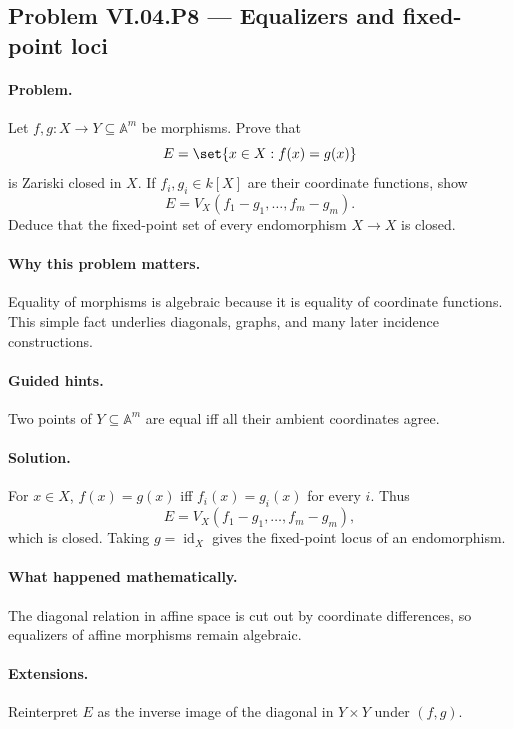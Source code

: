 \subsection*{Problem VI.04.P8 --- Equalizers and fixed-point loci}
\label{prob:vi04-p8}
\paragraph{Problem.}
Let \(f,g:X\to Y\subseteq\mathbb A^m\) be morphisms.  Prove that
\[
E=\set{x\in X:f(x)=g(x)}
\]
is Zariski closed in \(X\).  If \(f_i,g_i\in k[X]\) are their coordinate functions, show
\[
E=V_X(f_1-g_1,\dots,f_m-g_m).
\]
Deduce that the fixed-point set of every endomorphism \(X\to X\) is closed.
\ifdefined\FullProblemDossiers
\paragraph{Why this problem matters.}  Equality of morphisms is algebraic because it is equality of coordinate functions.  This simple fact underlies diagonals, graphs, and many
later incidence constructions.
\paragraph{Guided hints.}  Two points of \(Y\subseteq\mathbb A^m\) are equal iff all their
ambient coordinates agree.
\paragraph{Solution.}
For \(x\in X\), \(f(x)=g(x)\) iff \(f_i(x)=g_i(x)\) for every \(i\).  Thus
\[
E=V_X(f_1-g_1,\dots,f_m-g_m),
\]
which is closed.  Taking \(g=\operatorname{id}_X\) gives the fixed-point locus of an
endomorphism.
\paragraph{What happened mathematically.}  The diagonal relation in affine space is cut out
by coordinate differences, so equalizers of affine morphisms remain algebraic.
\paragraph{Extensions.}  Reinterpret \(E\) as the inverse image of the diagonal in
\(Y\times Y\) under \((f,g)\).
\fi
